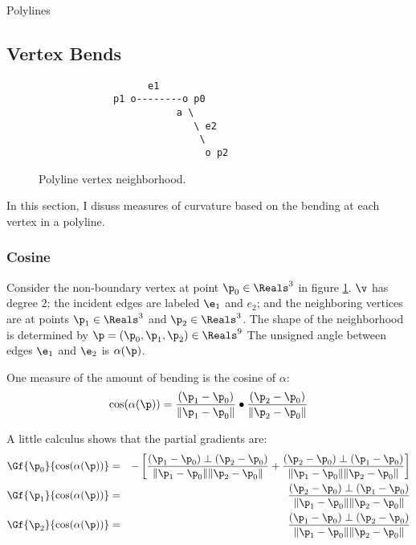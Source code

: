 \begin{plSection}{Polylines}
\subsection{Vertex Bends}
\label{sec:Vertex-Bends}

\begin{figure}[!htp]
\centering
\begin{verbatim}
                   e1
             p1 o--------o p0
                        a \
                           \ e2
                            \
                             o p2
\end{verbatim}
\caption{Polyline vertex neighborhood.
\label{fig:Polyline-vertex-neighborhood}}
\end{figure}

In this section, I disuss measures of curvature
based on the bending at each vertex in a polyline.


\subsubsection{Cosine}
\label{sec:polyline-vertex-cosine}

Consider the non-boundary vertex
at point $\p_0 \in \Reals^3$ in figure \ref{fig:Polyline-vertex-neighborhood}.
$\v$ has degree $2$;
the incident edges are labeled $\e_1$ and $e_2$;
and the neighboring vertices are at points $\p_1 \in \Reals^3$
and $\p_2 \in \Reals^3$.
The shape of the neighborhood is determined by
$\p = (\p_0, \p_1, \p_2) \in \Reals^9$
The unsigned angle between edges $\e_1$ and $\e_2$ is $\alpha(\p)$.

One measure of the amount of bending is the cosine of $\alpha$:
\begin{equation}
\cos(\alpha(\p)) =
{{(\p_1 - \p_0)} \over {\| \p_1 - \p_0 \|} }
\bullet
{{(\p_2 - \p_0)} \over {\| \p_2 - \p_0 \|} }
\end{equation}

A little calculus shows that the partial gradients are:
\begin{eqnarray}
\label{eq:polyline-vertex-cosine-gradient}
\Gf{\p_0}{\cos(\alpha(\p))}
& = &
-
\left[
{{(\p_1 - \p_0) \perp  (\p_2 - \p_0)}
\over
{\| \p_1 - \p_0 \| \| \p_2 - \p_0 \|} }
+
{{(\p_2 - \p_0) \perp  (\p_1 - \p_0)}
\over
{\| \p_1 - \p_0 \| \| \p_2 - \p_0 \|} }
\right]
\\
\Gf{\p_1}{\cos(\alpha(\p))}
& = &
{{(\p_2 - \p_0) \perp  (\p_1 - \p_0)}
\over
{\| \p_1 - \p_0 \| \| \p_2 - \p_0 \|} }
\nonumber
\\
\Gf{\p_2}{\cos(\alpha(\p))}
& = &
{{(\p_1 - \p_0) \perp  (\p_2 - \p_0)}
\over
{\| \p_1 - \p_0 \| \| \p_2 - \p_0 \|} }
\nonumber
\end{eqnarray}


\end{plSection}
